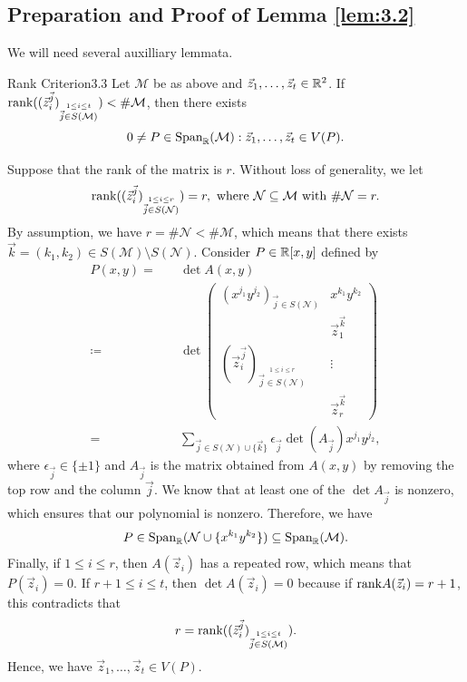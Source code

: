 \documentclass{Vorlesungstemplate_English} %
\begin{document}
\subsection{Preparation and Proof of Lemma \ref{lem:3.2}}
We will need several auxilliary lemmata.
  \begin{lemma}{Rank Criterion}{3.3}
    Let $\mathcal{M}$ be as above and $\vec z_1, \dots, \vec z_t \in \mathbb{R}^2$. If $\text{rank}((\vec z_i^{\vec j})_{\stackrel{1 \leq i \leq t}{\vec j \in S(\mathcal{M})}}) < \# \mathcal{M}$, then there exists
    \[ 0 \neq P \in \text{Span}_{\mathbb{R}}(\mathcal{M}): \vec z_1, \dots, \vec z_t \in V(P).\]
  \end{lemma}
  \begin{pf}
    Suppose that the rank of the matrix is $r$. Without loss of generality, we let
    \[ \text{rank}((\vec z_i^{\vec j})_{\stackrel{1 \leq i \leq r}{\vec j \in S(\mathcal{N})}}) = r, \text{ where } \mathcal{N} \subseteq \mathcal{M} \text{ with } \#\mathcal{N} = r.\]
    By assumption, we have $r = \#\mathcal{N} < \#\mathcal{M}$, which means that there exists $\vec k = (k_1, k_2) \in S(\mathcal{M}) \setminus S(\mathcal{N})$. Consider $P \in \mathbb{R}[x,y]$ defined by
    \begin{align*}
      P(x,y) = \quad & \det A(x,y) \\
      \coloneq \quad & \det\begin{pmatrix}
        (x^{j_1}y^{j_2})_{\vec j \in S(\mathcal{N})} & x^{k_1}y^{k_2} \\
        & \vec z_1^{\vec k} \\
        (\vec z_i^{\vec j})_{\stackrel{1 \leq i \leq r}{\vec j \in S(\mathcal{N})}} & \vdots \\
        & \vec z_r^{\vec k}
      \end{pmatrix} \\
      = \quad & \sum_{\vec j \in S(\mathcal{N}) \cup \{ \vec k\}} \epsilon_{\vec j}\det(A_{\vec j})x^{j_1}y^{j_2},
    \end{align*}
    where $\epsilon_{\vec j} \in \{ \pm 1\}$ and $A_{\vec j}$ is the matrix obtained from $A(x,y)$ by removing the top row and the column $\vec j$. We know that at least one of the $\det A_{\vec j}$ is nonzero, which ensures that our polynomial is nonzero. Therefore, we have
    \[ P \in \text{Span}_{\mathbb{R}}(\mathcal{N} \cup \{ x^{k_1}y^{k_2}\}) \subseteq \text{Span}_{\mathbb{R}}(\mathcal{M}).\]
    Finally, if $1 \leq i \leq r$, then $A(\vec z_i)$ has a repeated row, which means that $P(\vec z_i) = 0$. If $r+1 \leq i \leq t$, then $\det A(\vec z_i) = 0$ because if $\text{rank} A(\vec z_i) = r+1$, this contradicts that
    \[ r = \text{rank}((\vec z_i^{\vec j})_{\stackrel{1 \leq i \leq t}{\vec j \in S(\mathcal{M})}}).\]
    Hence, we have $\vec z_1, \dots, \vec z_t \in V(P).$
\end{pf}
\end{document}
